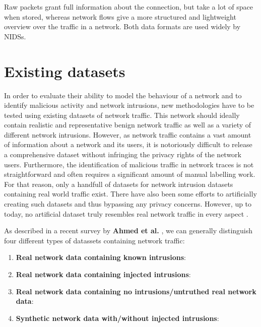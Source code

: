 \documentclass[a4paper,12pt,twoside]{report}
\begin{document}
Raw packets grant full information about the connection, but take a lot of space when stored, whereas network flows give a more structured and lightweight overview over the traffic in a network. Both data formats are used widely by NIDSs.

\section{Existing datasets}

In order to evaluate their ability to model the behaviour of a network and to identify malicious activity and network intrusions, new methodologies have to be tested using existing datasets of network traffic. This network should ideally contain realistic and representative benign network traffic as well as a variety of different network intrusions. However, as  network traffic contains a vast amount of information about a network and its users, it is notoriously difficult to release a comprehensive dataset without infringing the privacy rights of the network users. 
Furthermore, the identification of malicious traffic in network traces is not straightforward and often requires a significant amount of manual labelling work.
For that reason, only a handfull of datasets for network intrusion datasets containing real world traffic exist. There have also been some efforts to artificially creating such datasets and thus bypassing any privacy concerns. However, up to today, no artificial dataset truly resembles real network traffic in every aspect \cite{nisioti2018intrusion}.

As described in a recent survey by \textbf{Ahmed et al.} \cite{ahmed2016survey}, we can generally distinguish four different types of datassets containing network traffic:

\begin{enumerate}

\item \textbf{Real network data containing known intrusions}: 

\item \textbf{Real network data containing injected intrusions}:

\item \textbf{Real network data containing no intrusions/untruthed real network data}:

\item \textbf{Synthetic network data with/without injected intrusions}:

\end{enumerate}
\end{document}

